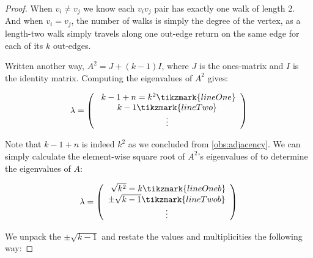 \documentclass{article}
\begin{document}
\begin{proof}
When $v_i \neq v_j$ we know each $v_iv_j$ pair has exactly one walk of length 2. And when $v_i = v_j$, the number of walks is simply the degree of the vertex, as a length-two walk simply travels along one out-edge return on the same edge for each of its $k$ out-edges.

Written another way, $A^2 = J + (k - 1)I$, where $J$ is the ones-matrix and $I$ is the identity matrix. 
Computing the eigenvalues of $A^2$ gives:


\[ \lambda = 
    \left (
        \begin{array}{c}
            \
            k - 1 + n = k^2 \tikzmark{lineOne} \\
            k - 1 \tikzmark{lineTwo}\\
            \vdots \\
        \end{array}
    \right )
\]


Note that $k - 1 + n$ is indeed $k^2$ as we concluded from \ref{obs:adjacency}. We can simply calculate the element-wise square root of $A^2$'s eigenvalues of to determine the eigenvalues of $A$:

\[ \lambda = 
    \left (
        \begin{array}{c}
            \
            \sqrt{k^2} = k \tikzmark{lineOneb} \\
            \pm \sqrt{k - 1} \tikzmark{lineTwob}\\
            \vdots \\
        \end{array}
    \right )
\]


We unpack the $\pm \sqrt{k-1}$ and restate the values and multiplicities the following way:


\end{proof}
\end{document}
